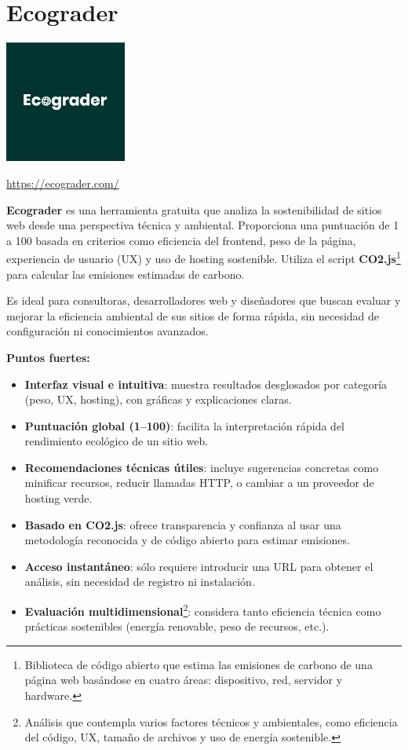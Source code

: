 \documentclass[12pt,a4paper]{report}
\begin{document}
\section*{\textbf{Ecograder}}

\begin{center}
\includegraphics[width=0.3\textwidth]{imagenes/Ecograder_Logo.png}
\end{center}

\url{https://ecograder.com/}

\textbf{Ecograder} es una herramienta gratuita que analiza la sostenibilidad de sitios web desde una perspectiva técnica y ambiental. Proporciona una puntuación de 1 a 100 basada en criterios como eficiencia del frontend, peso de la página, experiencia de usuario (UX) y uso de hosting sostenible. Utiliza el script \textbf{CO2.js}\footnote{Biblioteca de código abierto que estima las emisiones de carbono de una página web basándose en cuatro áreas: dispositivo, red, servidor y hardware.} para calcular las emisiones estimadas de carbono.

Es ideal para consultoras, desarrolladores web y diseñadores que buscan evaluar
y mejorar la eficiencia ambiental de sus sitios de forma rápida, sin necesidad
de configuración ni conocimientos avanzados.

\textbf{Puntos fuertes:}
\begin{itemize}
  \item \textbf{Interfaz visual e intuitiva}: muestra resultados desglosados por categoría (peso, UX, hosting), con gráficas y explicaciones claras.
  \item \textbf{Puntuación global (1–100)}: facilita la interpretación rápida del rendimiento ecológico de un sitio web.
  \item \textbf{Recomendaciones técnicas útiles}: incluye sugerencias concretas como minificar recursos, reducir llamadas HTTP, o cambiar a un proveedor de hosting verde.
  \item \textbf{Basado en CO2.js}: ofrece transparencia y confianza al usar una metodología reconocida y de código abierto para estimar emisiones.
  \item \textbf{Acceso instantáneo}: sólo requiere introducir una URL para obtener el análisis, sin necesidad de registro ni instalación.
  \item \textbf{Evaluación multidimensional}\footnote{Análisis que contempla varios factores técnicos y ambientales, como eficiencia del código, UX, tamaño de archivos y uso de energía sostenible.}: considera tanto eficiencia técnica como prácticas sostenibles (energía renovable, peso de recursos, etc.).
\end{itemize}
\end{document}
